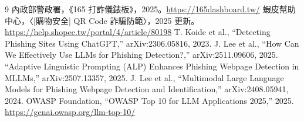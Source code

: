 \documentclass[11pt]{ctexart}
\begin{document}
\begin{thebibliography}{9}
 內政部警政署，《165 打詐儀錶板》，2025。\url{https://165dashboard.tw/}
 蝦皮幫助中心，〈[購物安全] QR Code 詐騙防範〉，2025 更新。\url{https://help.shopee.tw/portal/4/article/80198}
 T. Koide et al., ``Detecting Phishing Sites Using ChatGPT,'' arXiv:2306.05816, 2023.
 J. Lee et al., ``How Can We Effectively Use LLMs for Phishing Detection?,'' arXiv:2511.09606, 2025.
 ``Adaptive Linguistic Prompting (ALP) Enhances Phishing Webpage Detection in MLLMs,'' arXiv:2507.13357, 2025.
 J. Lee et al., ``Multimodal Large Language Models for Phishing Webpage Detection and Identification,'' arXiv:2408.05941, 2024.
 OWASP Foundation, ``OWASP Top 10 for LLM Applications 2025,'' 2025. \url{https://genai.owasp.org/llm-top-10/}
\end{thebibliography}
\end{document}
